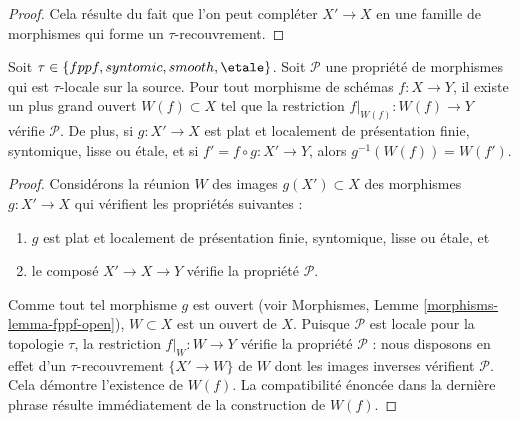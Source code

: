\begin{proof}
Cela résulte du fait que l'on peut compléter $X' \to X$ en une famille de
morphismes qui forme un $\tau$-recouvrement.
\end{proof}

\begin{lemma}
\label{lemma-largest-open-of-the-source}
Soit $\tau \in \{fppf, syntomic, smooth, \etale\}$.
Soit $\mathcal{P}$ une propriété de morphismes qui est $\tau$-locale
sur la source. Pour tout morphisme de schémas $f : X \to Y$, il existe
un plus grand ouvert $W(f) \subset X$ tel que la restriction
$f|_{W(f)} : W(f) \to Y$ vérifie $\mathcal{P}$. De plus,
si $g : X' \to X$ est plat et localement de présentation finie,
syntomique, lisse ou \'etale, et si $f' = f \circ g : X' \to Y$, alors
$g^{-1}(W(f)) = W(f')$.
\end{lemma}

\begin{proof}
Considérons la réunion $W$ des images $g(X') \subset X$ des
morphismes $g : X' \to X$ qui vérifient les propriétés suivantes :
\begin{enumerate}
\item $g$ est plat et localement de présentation finie, syntomique,
lisse ou \'etale, et
\item le composé $X' \to X \to Y$ vérifie la propriété $\mathcal{P}$.
\end{enumerate}
Comme tout tel morphisme $g$ est ouvert (voir
Morphismes, Lemme \ref{morphisms-lemma-fppf-open}),
$W \subset X$ est un ouvert de $X$. Puisque $\mathcal{P}$ est locale pour la
topologie $\tau$, la restriction $f|_W : W \to Y$ vérifie la propriété
$\mathcal{P}$ : nous disposons en effet d'un $\tau$-recouvrement
$\{X' \to W\}$ de $W$ dont les images inverses vérifient $\mathcal{P}$.
Cela démontre l'existence de $W(f)$.
La compatibilité énoncée dans la dernière phrase résulte immédiatement de la
construction de $W(f)$.
\end{proof}


